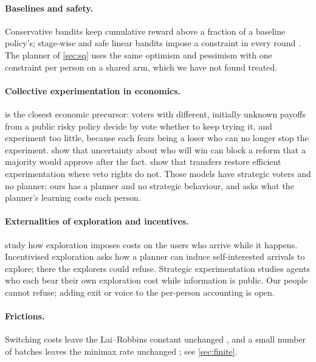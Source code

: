 \documentclass[11pt,a4paper]{article}
\theoremstyle{plain}
\theoremstyle{definition}
\theoremstyle{remark}
\begin{document}
\paragraph{Baselines and safety.} Conservative bandits \citep{wu2016} keep cumulative reward above a fraction of a baseline policy's; stage-wise and safe linear bandits impose a constraint in every round \citep{moradipari2020,amani2019}. The planner of \cref{sec:sq} uses the same optimism and pessimism with one constraint per person on a shared arm, which we have not found treated.

\paragraph{Collective experimentation in economics.} \citet{strulovici2010} is the closest economic precursor: voters with different, initially unknown payoffs from a public risky policy decide by vote whether to keep trying it, and experiment too little, because each fears being a loser who can no longer stop the experiment. \citet{fernandez1991} show that uncertainty about who will win can block a reform that a majority would approve after the fact. \citet{anesi2021} show that transfers restore efficient experimentation where veto rights do not. Those models have strategic voters and no planner; ours has a planner and no strategic behaviour, and asks what the planner's learning costs each person.

\paragraph{Externalities of exploration and incentives.} \citet{raghavan2018} study how exploration imposes costs on the users who arrive while it happens. Incentivised exploration \citep{kremer2014,mansour2020} asks how a planner can induce self-interested arrivals to explore; there the explorers could refuse. Strategic experimentation \citep{bolton1999,keller2005} studies agents who each bear their own exploration cost while information is public. Our people cannot refuse; adding exit or voice to the per-person accounting is open.

\paragraph{Frictions.} Switching costs leave the Lai--Robbins constant unchanged \citep{agrawal1988}, and a small number of batches leaves the minimax rate unchanged \citep{perchet2016,gao2019}; see \cref{sec:finite}.
\end{document}
